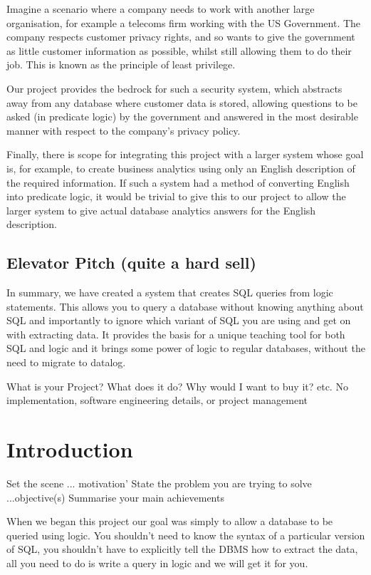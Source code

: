 \documentclass[a4paper, 11pt]{article}
\begin{document}
  Imagine a scenario where a company needs to work with another large
  organisation, for example a telecoms firm working with the US Government. The
  company respects customer privacy rights, and so wants to give the government
  as little customer information as possible, whilst still allowing them to do
  their job. This is known as the principle of least privilege.

  Our project provides the bedrock for such a security system, which
  abstracts away from any database where customer data is stored, allowing
  questions to be asked (in predicate logic) by the government and answered in
  the most desirable manner with respect to the company's privacy policy.

  Finally, there is scope for integrating this project with a larger system
  whose goal is, for example, to create business analytics using only an
  English description of the required information. If such a system had a
  method of converting English into predicate logic, it would be trivial to
  give this to our project to allow the larger system to give actual database
  analytics answers for the English description.

  \subsection*{Elevator Pitch (quite a hard sell)}
  In summary, we have created a system that creates SQL queries from logic 
  statements. This allows you to query a database without knowing anything
  about SQL and importantly to ignore which variant of SQL you
  are using and get on with extracting data. It provides the basis for a
  unique teaching tool for both SQL and logic and it brings some power
  of logic to regular databases, without the need to migrate to datalog.

  What is your Project? What does it do? Why would I want to buy it? etc.
  No implementation, software engineering details, or project management

\section{Introduction}

  Set the scene ... motivation'
  State the problem you are trying to solve ...objective(s)
  Summarise your main achievements 

When we began this project our goal was simply to allow a database to be 
queried using logic. You shouldn't need to know the syntax of a particular
version of SQL, you shouldn't have to explicitly tell the DBMS how to extract
the data, all you need to do is write a query in logic and we will
get it for you.
\end{document}
